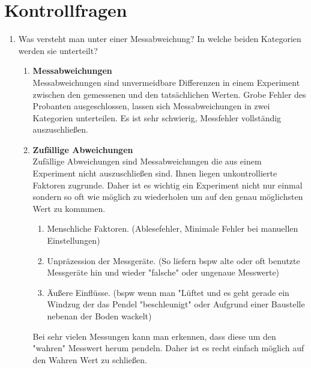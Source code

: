 \documentclass[fleqn,10pt]{olplainarticle}
\begin{document}
\section{Kontrollfragen}
 \begin{enumerate}
     \item Was versteht man unter einer Messabweichung? In welche beiden Kategorien werden sie unterteilt?
    \begin{enumerate}
     \item \textbf{Messabweichungen}  \\
    Messabweichungen sind unvermeidbare Differenzen in einem Experiment zwischen den gemessenen und den tatsächlichen Werten. Grobe Fehler des Probanten ausgeschlossen, lassen sich Messabweichungen in zwei Kategorien unterteilen. Es ist sehr schwierig, Messfehler vollständig auszuschließen.
        \item \textbf{Zufällige Abweichungen}  \\
        Zufällige Abweichungen sind Messabweichungen die aus einem Experiment nicht auszuschließen sind. Ihnen liegen unkontrollierte Faktoren zugrunde. Daher ist es wichtig ein Experiment nicht nur einmal sondern so oft wie möglich zu wiederholen um auf den genau möglichsten Wert zu kommmen.
        \begin{enumerate}
            \item Menschliche Faktoren. (Ablesefehler, Minimale Fehler bei manuellen Einstellungen)
            \item Unpräzession der Messgeräte. (So liefern bspw alte oder oft benutzte Messgeräte hin und wieder "falsche" oder ungenaue Messwerte)
            \item Äußere Einflüsse. (bspw wenn man "Lüftet und es geht gerade ein Windzug der das Pendel "beschleunigt" oder Aufgrund einer Baustelle nebenan der Boden wackelt)
        \end{enumerate}
        Bei sehr vielen Messungen kann man erkennen, dass diese um den "wahren" Messwert herum pendeln. Daher ist es recht einfach möglich auf den Wahren Wert zu schließen.
        

\end{enumerate}
\end{enumerate}
\end{document}
